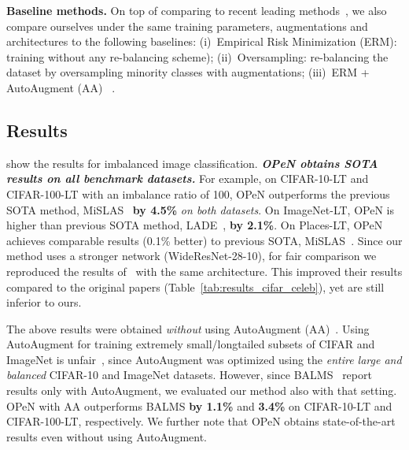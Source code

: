 \documentclass[nohyperref]{article}
\theoremstyle{plain}
\theoremstyle{definition}
\theoremstyle{remark}
\begin{document}
	\noindent\textbf{Baseline methods.} On top of comparing to recent leading methods~\cite{cao2019learning,hong2021disentangling,ren2020balanced,zhong2021improving,kim2020m2m}, we also compare ourselves under the same training parameters, augmentations and architectures to the following baselines: (i)~Empirical Risk Minimization (ERM): training without any re-balancing scheme); (ii)~Oversampling: re-balancing the dataset by oversampling minority classes with augmentations; (iii)~ERM + AutoAugment (AA) ~\cite{cubuk2019autoaugment}. 

\subsection{Results}\label{subsec:imbalanced_results}
 show the results for imbalanced image classification. \textbf{ \emph{OPeN obtains SOTA results on all benchmark datasets.}}  For example, on CIFAR-10-LT and CIFAR-100-LT with an imbalance ratio of 100, OPeN outperforms the previous SOTA method, MiSLAS~\cite{zhong2021improving} \textbf{by 4.5\%} \emph{on both datasets}. On ImageNet-LT, OPeN is higher than previous SOTA method, LADE~\cite{hong2021disentangling}, \textbf{by 2.1\%}. 
On Places-LT, OPeN achieves comparable results (0.1\% better) to previous SOTA, MiSLAS~\cite{zhong2021improving}.
Since our method uses a stronger network (WideResNet-28-10), for fair comparison we reproduced the results of~\cite{cao2019learning,kim2020m2m} with the same architecture.
This improved their results compared to the original papers (Table~\ref{tab:results_cifar_celeb}), yet are still inferior to ours.

The above results were obtained \emph{without} using AutoAugment (AA)~\cite{cubuk2019autoaugment}. 
Using AutoAugment for training extremely small/longtailed subsets of CIFAR and ImageNet is unfair~\cite{azuri2021generative}, since AutoAugment was optimized using the \emph{entire  large and balanced} CIFAR-10 and ImageNet datasets. 
However, since BALMS~\cite{ren2020balanced}  report  results only with AutoAugment, we evaluated our method also with that setting. OPeN with AA outperforms BALMS  \textbf{by 1.1\%} and \textbf{3.4\%} on CIFAR-10-LT and CIFAR-100-LT, respectively. 
We further note that OPeN obtains state-of-the-art results even without using AutoAugment. 
\end{document}
